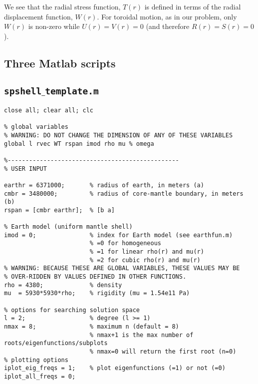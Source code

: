 \documentclass[11pt,titlepage,fleqn]{article}
\begin{document}
We see that the radial stress function, $T(r)$ is defined in terms of the radial displacement function, $W(r)$. For toroidal motion, as in our problem, only $W(r)$ is non-zero while $U(r) = V(r) = 0$ (and therefore $R(r) = S(r) = 0$).




\normalsize


\begin{spacing}{1.0}

\section{Three Matlab scripts}

\subsection{\tt spshell$\_$template.m}
\label{sec:shell}

\small
\begin{verbatim}
close all; clear all; clc

% global variables
% WARNING: DO NOT CHANGE THE DIMENSION OF ANY OF THESE VARIABLES
global l rvec WT rspan imod rho mu % omega

%------------------------------------------------
% USER INPUT

earthr = 6371000;       % radius of earth, in meters (a)
cmbr = 3480000;         % radius of core-mantle boundary, in meters (b)
rspan = [cmbr earthr];  % [b a]

% Earth model (uniform mantle shell)
imod = 0;               % index for Earth model (see earthfun.m)
                        % =0 for homogeneous
                        % =1 for linear rho(r) and mu(r)
                        % =2 for cubic rho(r) and mu(r)
% WARNING: BECAUSE THESE ARE GLOBAL VARIABLES, THESE VALUES MAY BE
% OVER-RIDDEN BY VALUES DEFINED IN OTHER FUNCTIONS.                        
rho = 4380;             % density
mu  = 5930*5930*rho;    % rigidity (mu = 1.54e11 Pa)

% options for searching solution space
l = 2;                  % degree (l >= 1)
nmax = 8;               % maximum n (default = 8)
                        % nmax+1 is the max number of roots/eigenfunctions/subplots
                        % nmax=0 will return the first root (n=0)
% plotting options                        
iplot_eig_freqs = 1;    % plot eigenfunctions (=1) or not (=0)
iplot_all_freqs = 0;


\end{verbatim}
\end{spacing}
\end{document}
